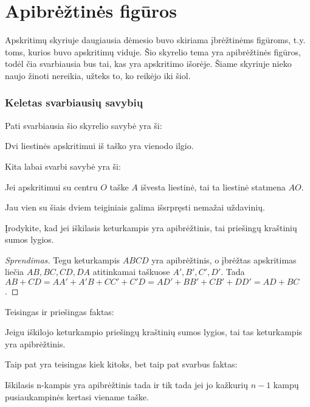 \newpage
\section{Apibrėžtinės figūros}

Apskritimų skyriuje daugiausia dėmesio buvo skiriama
įbrėžtinėms figūroms, t.y. toms, kurios buvo apskritimų
viduje. Šio skyrelio tema yra apibrėžtinės figūros, todėl
čia svarbiausia bus tai, kas yra apskritimo išorėje. Šiame
skyriuje nieko naujo žinoti nereikia, užteks to, ko reikėjo
iki šiol.

\subsubsection{Keletas svarbiausių savybių}

Pati svarbiausia šio skyrelio savybė yra ši:

\begin{teig}
  Dvi liestinės apskritimui iš taško yra vienodo ilgio.
\end{teig}

Kita labai svarbi savybė yra ši:

\begin{teig}
  Jei apskritimui su centru $O$ taške $A$ išvesta liestinė,
  tai ta liestinė statmena $AO$.
\end{teig}

Jau vien su šiais dviem teiginiais galima išsrpręsti nemažai
uždavinių.

\begin{pav}
  Įrodykite, kad jei iškilasis keturkampis yra apibrėžtinis,
  tai priešingų kraštinių sumos lygios. 
\end{pav}

\begin{proof}[Sprendimas]
  Tegu keturkampis $ABCD$ yra apibrėžtinis, o įbrėžtas
  apskritimas liečia $AB,BC,CD,DA$ atitinkamai taškuose
  $A',B',C',D'$. Tada $AB+CD = AA'+A'B+CC'+C'D =
  AD'+BB'+CB'+DD' = AD+BC$.
\end{proof}

Teisingas ir priešingas faktas: 

\begin{teig}
  Jeigu iškilojo keturkampio priešingų kraštinių sumos lygios,
  tai tas keturkampis yra apibrėžtinis.
\end{teig}

Taip pat yra teisingas kiek kitoks, bet taip pat svarbus
faktas:

\begin{teig}
  Iškilasis n-kampis yra apibrėžtinis tada ir tik tada jei jo
  kažkurių $n-1$ kampų pusiaukampinės kertasi viename taške.
\end{teig}

